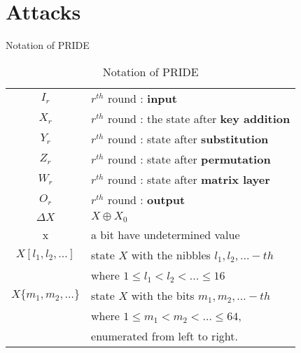 \section{Attacks}
\begin{frame}{Notation of PRIDE}
    \begin{table}[H]
		\centering
		\begin{tabular}{cl}
			$ I_r $ & $ r^{th} $ round : \textbf{input}\\ 
			$ X_r $ & $ r^{th} $ round : the state after \textbf{key addition}\\ 
			$ Y_r $ & $ r^{th} $ round : state after \textbf{substitution}\\
			$ Z_r $ & $ r^{th} $ round : state after \textbf{permutation}\\ 
			$ W_r $ & $ r^{th} $ round : state after \textbf{matrix layer}\\ 
			$ O_r $ & $ r^{th} $ round : \textbf{output}\\ 
			$ \Delta X $ & $ X \oplus X_0 $ \\ 
			x & a bit have undetermined value\\ 
			$ X[l_1 , l_2, \dots] $ & state $ X $ with the nibbles $ l_1, l_2, \dots-th $\\
			    & where $ 1\le l_1 < l_2 < . . . \le 16 $ \\ 
			$ X\{m_1 , m_2, \dots\} $ & state $ X $ with the bits $ m_1, m_2, \dots-th $\\
			& where $ 1 \le m_1 < m_2 < \dots \le 64 $, \\
			& enumerated from left to right.\\ 
		\end{tabular}
		\caption{Notation of PRIDE}
		\label{n}
	\end{table}
\end{frame}

